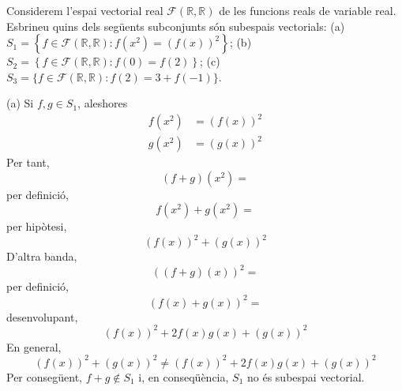 \begin{exercici}
Considerem l’espai vectorial real $\mathcal{F}(\mathbb{R},\mathbb{R})$
de les funcions reals de variable real. Esbrineu quins dels
següents subconjunts són subespais vectorials: (a) $S_{1}=\left\{ f\in
\mathcal{F}(\mathbb{R},\mathbb{R}):f(x^{2})=(f(x))^{2}\right\} $; (b) $%
S_{2}=\left\{ f\in \mathcal{F}(\mathbb{R},\mathbb{R}):f(0)=f(2)\right\} $;
(c) $S_{3}=\{f\in \mathcal{F}(\mathbb{R},\mathbb{R}):f(2)=3+f(-1)\}$.

\end{exercici}
\begin{solucio}
(a) Si $f,g\in S_{1}$, aleshores%
\begin{align*}
f(x^{2}) &=(f(x))^{2} \\
g(x^{2}) &=(g(x))^{2}
\end{align*}%
Per tant,
\begin{equation*}
(f+g)(x^{2})=
\end{equation*}%
per definició,%
\begin{equation*}
f(x^{2})+g(x^{2})=
\end{equation*}%
per hipòtesi,%
\begin{equation*}
(f(x))^{2}+(g(x))^{2}
\end{equation*}%
D’altra banda,%
\begin{equation*}
((f+g)(x))^{2}=
\end{equation*}%
per definició,%
\begin{equation*}
(f(x)+g(x))^{2}=
\end{equation*}%
desenvolupant,%
\begin{equation*}
(f(x))^{2}+2f(x)g(x)+(g(x))^{2}
\end{equation*}%
En general,%
\begin{equation*}
(f(x))^{2}+(g(x))^{2}\neq (f(x))^{2}+2f(x)g(x)+(g(x))^{2}
\end{equation*}%
Per consegüent, $f+g\notin S_{1}$ i, en conseqüència, $S_{1}$ no és
subespai vectorial.


\end{solucio}
